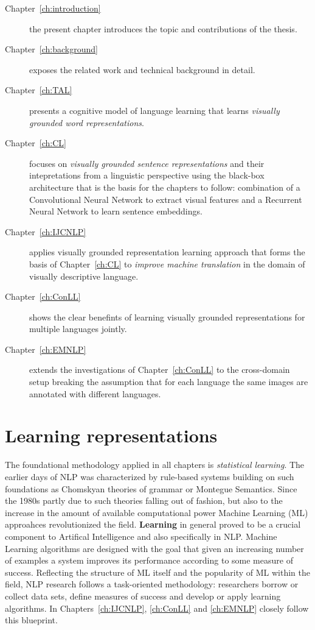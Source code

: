 \begin{description}
\item[Chapter~\ref{ch:introduction}] the present chapter introduces the topic and contributions of 
the thesis.

\item[Chapter~\ref{ch:background}] exposes the related work and technical background in detail. 

\item[Chapter~\ref{ch:TAL}] presents
a cognitive model of language learning that learns \emph{visually grounded word representations}.

\item[Chapter~\ref{ch:CL} ] focuses on \emph{visually grounded sentence representations} and their 
intepretations from a linguistic perspective using the black-box architecture that is the basis 
for the chapters to follow: combination of a Convolutional Neural Network to extract visual features and
a Recurrent Neural Network to learn sentence embeddings.

\item[Chapter~\ref{ch:IJCNLP}] applies visually grounded representation learning approach that forms the
basis of Chapter~\ref{ch:CL} to \emph{improve machine translation} in the domain of visually descriptive language. 

\item[Chapter~\ref{ch:ConLL}] shows the clear benefints of learning visually grounded representations
for multiple languages jointly.

\item[Chapter~\ref{ch:EMNLP}] extends the investigations of Chapter~\ref{ch:ConLL} to the 
cross-domain setup breaking the assumption that for each language the same images are annotated
with different languages.
\end{description}
 


\section{Learning representations}
The foundational methodology applied in all chapters is \emph{statistical learning}. 
The earlier days of NLP was characterized by rule-based systems building on such 
foundations as Chomskyan theories of grammar or Montegue Semantics. 
Since the 1980s partly due to such theories falling out of fashion, but also to the increase in the amount 
of available computational power Machine Learning (ML) approahces revolutionized
the field.  \textbf{Learning} in general proved to be a crucial component to Artifical Intelligence and also
specifically in NLP. Machine Learning algorithms are designed with the goal that given an increasing 
number of examples a system improves its performance according to some measure of success.
Reflecting the structure of ML itself and the popularity of ML within the field, NLP research follows
a task-oriented methodology: researchers borrow or collect data sets, define measures of success and develop or
apply learning algorithms. In Chapters~\ref{ch:IJCNLP}, \ref{ch:ConLL} and 
\ref{ch:EMNLP}  closely follow this blueprint.

